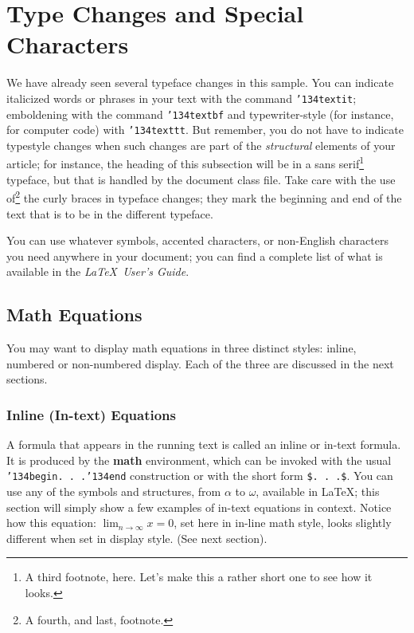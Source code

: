 \documentclass[acmtog, authorversion]{acmart}
\begin{document}
\section{Type Changes and Special Characters}
We have already seen several typeface changes in this sample.  You
can indicate italicized words or phrases in your text with the
command \texttt{{\char'134}textit}; emboldening with the command
\texttt{{\char'134}textbf} and typewriter-style (for instance, for
computer code) with \texttt{{\char'134}texttt}.  But remember, you
do not have to indicate typestyle changes when such changes are
part of the \textit{structural} elements of your article; for
instance, the heading of this subsection will be in a sans
serif\footnote{A third footnote, here. Let's make this a rather
short one to see how it looks.} typeface, but that is handled by
the document class file. Take care with the use of\footnote{A
fourth, and last, footnote.} the curly braces in typeface changes;
they mark the beginning and end of the text that is to be in the
different typeface.

You can use whatever symbols, accented characters, or non-English
characters you need anywhere in your document; you can find a
complete list of what is available in the \textit{\LaTeX\ User's
Guide}\cite{Lamport:LaTeX}.

\subsection{Math Equations}
You may want to display math equations in three distinct styles:
inline, numbered or non-numbered display.  Each of the three are
discussed in the next sections.

\subsubsection{Inline (In-text) Equations}
A formula that appears in the running text is called an inline or
in-text formula.  It is produced by the \textbf{math} environment,
which can be invoked with the usual \texttt{{\char'134}begin. .
.{\char'134}end} construction or with the short form \texttt{\$. .
.\$}. You can use any of the symbols and structures, from $\alpha$
to $\omega$, available in \LaTeX\cite{Lamport:LaTeX}; this section
will simply show a few examples of in-text equations in context.
Notice how this equation: \begin{math}\lim_{n\rightarrow
\infty}x=0\end{math}, set here in in-line math style, looks
slightly different when set in display style.  (See next section).
\end{document}
